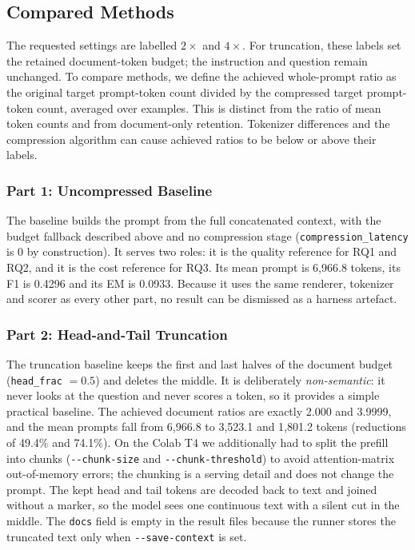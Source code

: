 \documentclass[10pt,a4paper,twocolumn]{article}
\begin{document}
\subsection{Compared Methods}

The requested settings are labelled $2\times$ and $4\times$. For truncation,
these labels set the retained document-token budget; the instruction and question
remain unchanged. To compare methods, we define the achieved whole-prompt ratio
as the original target prompt-token count divided by the compressed target
prompt-token count, averaged over examples. This is distinct from the ratio of
mean token counts and from document-only retention. Tokenizer differences and the
compression algorithm can cause achieved ratios to be below or above their labels.

\subsubsection{Part 1: Uncompressed Baseline}

The baseline builds the prompt from the full concatenated context, with the budget
fallback described above and no compression stage (\texttt{compression\_latency}
is 0 by construction). It serves two roles: it is the quality reference for RQ1
and RQ2, and it is the cost reference for RQ3. Its mean prompt is 6{,}966.8
tokens, its F1 is 0.4296 and its EM is 0.0933. Because it uses the same renderer,
tokenizer and scorer as every other part, no result can be dismissed as a
harness artefact.

\subsubsection{Part 2: Head-and-Tail Truncation}

The truncation baseline keeps the first and last halves of the document budget
(\texttt{head\_frac} $=0.5$) and deletes the middle. It is deliberately
\emph{non-semantic}: it never looks at the question and never scores a token, so it
provides a simple practical baseline. The achieved document ratios are exactly
2.000 and 3.9999, and the mean prompts fall from 6{,}966.8 to 3{,}523.1 and
1{,}801.2 tokens (reductions of 49.4\% and 74.1\%). On the Colab T4 we additionally
had to split the prefill into chunks (\texttt{-{}-chunk-size} and
\texttt{-{}-chunk-threshold}) to avoid attention-matrix out-of-memory errors; the chunking is a serving detail and does not change the prompt. The kept head and tail tokens are decoded back to text and joined without a marker, so the model sees one continuous text with a silent cut in the middle. The \texttt{docs} field is empty in the result files because the runner stores the truncated text only when \texttt{-{}-save-context} is set.
\end{document}
